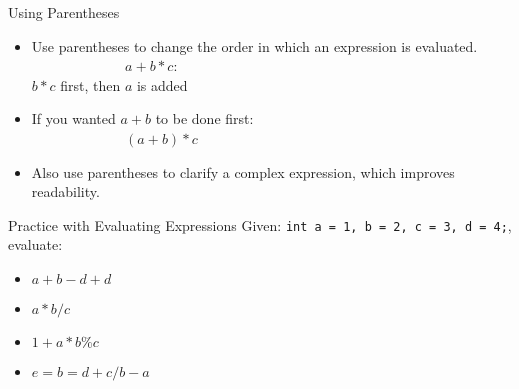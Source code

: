 \documentclass[graphics]{beamer}
\begin{document}
\begin{frame}{Using Parentheses}
    \begin{itemize}
        \item Use parentheses to change the order in which an expression is evaluated. \\
        ~~ ~~ ~~ ~~ ~~ $a + b * c$: \\ 
        $b*c$ first, then $a$ is added
        \item If you wanted $a + b$ to be done first: \\
        ~~ ~~ ~~ ~~ ~~ $(a + b) * c$
        \item Also use parentheses to clarify a complex expression, which improves readability.
    \end{itemize}
\end{frame}

\begin{frame}{Practice with Evaluating Expressions}
    Given: \texttt{int a = 1, b = 2, c = 3, d = 4;}, evaluate:
    \begin{itemize}
        \item $a + b - d + d$
        \item $a * b / c$
        \item $1 + a * b \% c$
        \item $e = b = d + c / b - a$
    \end{itemize}
\end{frame}
\end{document}
